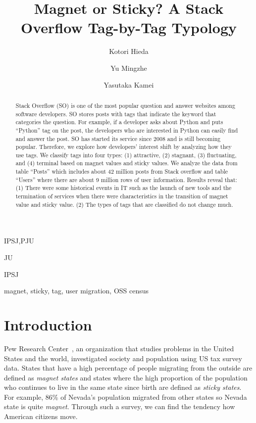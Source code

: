 \documentclass[english,preprint,JIP]{ipsj}
\begin{document}
\title{Magnet or Sticky? A Stack Overflow Tag-by-Tag Typology\\}


\author{Kotori Hieda}{IPSJ,PJU}
\author{Yu Mingzhe}{JU}
\author{Yasutaka Kamei}{IPSJ}


\begin{abstract}
Stack Overflow (SO) is one of the most popular question and answer websites among software developers. SO stores posts with tags that indicate the keyword that categories the question. For example, if a developer asks about Python and puts ``Python'' tag on the post, the developers who are interested in Python can easily find and answer the post. SO has started its service since 2008 and is still becoming popular. Therefore, we explore how developers' interest shift by analyzing how they use tags. We classify tags into four types: (1) attractive, (2) stagnant, (3) fluctuating, and (4) terminal based on magnet values and sticky values. We analyze the data from table ``Posts'' which includes about 42 million posts from Stack overflow and table ``Users'' where there are about 9 million rows of user information. Results reveal that: 
(1) There were some historical events in IT such as the launch of new tools and the termination of services when there were characteristics in the transition of magnet value and sticky value.
(2) The types of tags that are classified do not change much.
\end{abstract}

\begin{keyword}
magnet, sticky, tag, user migration, OSS census
\end{keyword}

\maketitle

\section{Introduction}
Pew Research Center~\cite{communityeconomic}, an organization that studies problems in the United States and the world, investigated society and population using US tax survey data.  States that have a high percentage of people migrating from the outside are defined as \emph{magnet states} and states where the high proportion of the population who continues to live in the same state since birth are defined as \emph{sticky states}. For example, 86\% of Nevada's population migrated from other states so Nevada state is quite \emph{magnet}. Through such a survey, we can find the tendency how American citizens move.
\end{document}
